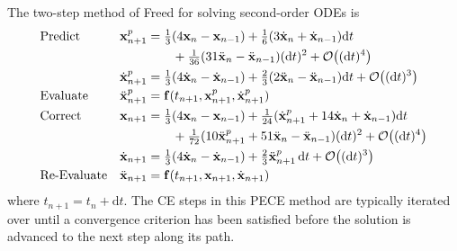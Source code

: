 The two-step method of Freed \cite{Freed17a} for solving second-order ODEs is
\begin{subequations}
    \label{pairedMethods}
    \begin{align}
    \mbox{} & \text{Predict} &
    \mathbf{x}_{n+1}^p & = \tfrac{1}{3} (
    4 \mathbf{x}_n - \mathbf{x}_{n-1} ) + 
    \tfrac{1}{6} ( 3 \dot{\mathbf{x}}_n + 
    \dot{\mathbf{x}}_{n-1} ) \mathrm{d}t \notag \\ 
    \mbox{} & & & \qquad + 
    \tfrac{1}{36} ( 31 \ddot{\mathbf{x}}_n - 
    \ddot{\mathbf{x}}_{n-1} ) (\mathrm{d}t)^2 + 
    \mathcal{O} \bigl( (\mathrm{d}t)^4 \bigr) 
    \label{displacementPredictor} \\
    \mbox{} & &
    \dot{\mathbf{x}}_{n+1}^p & = \tfrac{1}{3} 
    ( 4 \dot{\mathbf{x}}_n - \dot{\mathbf{x}}_{n-1} ) + 
    \tfrac{2}{3} ( 2\ddot{\mathbf{x}}_n - \ddot{\mathbf{x}}_{n-1} )
    \mathrm{d}t + \mathcal{O} \bigl( (\mathrm{d}t)^3 \bigr)
    \label{velocityPredictor} \\
    \mbox{} & \text{Evaluate} &
    \ddot{\mathbf{x}}^p_{n+1} & = \mathbf{f} (t_{n+1}, \mathbf{x}^p_{n+1}, \dot{\mathbf{x}}^p_{n+1}) 
    \label{2ndEvaluate} \\
    \mbox{} & \text{Correct} & 
    \mathbf{x}_{n+1} & = \tfrac{1}{3} (
    4  \mathbf{x}_n - \mathbf{x}_{n-1} ) +
    \tfrac{1}{24} ( \dot{\mathbf{x}}^p_{n+1} +
    14 \dot{\mathbf{x}}_n + \dot{\mathbf{x}}_{n-1} ) \mathrm{d}t 
    \notag \\
    \mbox{} & & & \qquad +
    \tfrac{1}{72} ( 10 \ddot{\mathbf{x}}^p_{n+1} + 
    51 \ddot{\mathbf{x}}_n - \ddot{\mathbf{x}}_{n-1} ) (\mathrm{d}t)^2 + 
    \mathcal{O} \bigl( (\mathrm{d}t)^4 \bigr)
    \label{displacementCorrector} \\ 
    \mbox{} & &
    \dot{\mathbf{x}}_{n+1} & = \tfrac{1}{3} 
    ( 4 \dot{\mathbf{x}}_n - \dot{\mathbf{x}}_{n-1} ) + 
    \tfrac{2}{3} \ddot{\mathbf{x}}^p_{n+1} \, \mathrm{d}t + 
    \mathcal{O} \bigl( (\mathrm{d}t)^3 \bigr)
    \label{velocityCorrector} \\
    \mbox{} & \text{Re-Evaluate} & 
    \ddot{\mathbf{x}}_{n+1} & = \mathbf{f} (t_{n+1}, \mathbf{x}_{n+1}, \dot{\mathbf{x}}_{n+1})
    \label{2ndReEvaluate}
    \end{align}
\end{subequations}
where $t_{n+1} = t_n + \mathrm{d}t$.  The CE steps in this PECE method are typically iterated over until a convergence criterion has been satisfied before the solution is advanced to the next step along its path.

